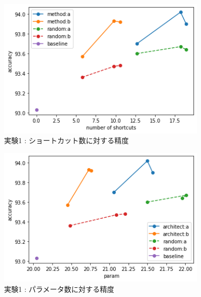 \begin{figure}[t]
  \begin{center}
    \includegraphics[clip,width=10cm]{./fig/short.png}
  \end{center}
  \caption{実験1 : ショートカット数に対する精度}
  \label{fig:short}
\end{figure}
\begin{figure}[t]
  \begin{center}
    \includegraphics[clip,width=10cm]{./fig/param.png}
  \end{center}
  \caption{実験1 : パラメータ数に対する精度}
  \label{fig:param}
\end{figure}


